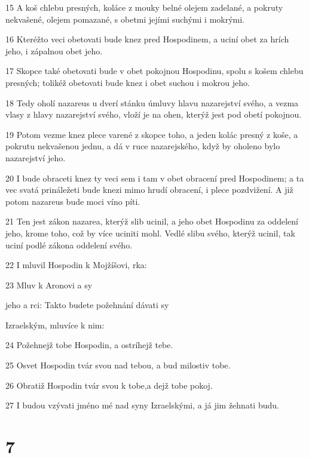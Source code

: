 \par 15 A koš chlebu presných, koláce z mouky belné olejem zadelané, a pokruty nekvašené, olejem pomazané, s obetmi jejími suchými i mokrými.
\par 16 Kteréžto veci obetovati bude knez pred Hospodinem, a uciní obet za hrích jeho, i zápalnou obet jeho.
\par 17 Skopce také obetovati bude v obet pokojnou Hospodinu, spolu s košem chlebu presných; tolikéž obetovati bude knez i obet suchou i mokrou jeho.
\par 18 Tedy oholí nazareus u dverí stánku úmluvy hlavu nazarejství svého, a vezma vlasy z hlavy nazarejství svého, vloží je na ohen, kterýž jest pod obetí pokojnou.
\par 19 Potom vezme knez plece varené z skopce toho, a jeden kolác presný z koše, a pokrutu nekvašenou jednu, a dá v ruce nazarejského, když by oholeno bylo nazarejství jeho.
\par 20 I bude obraceti knez ty veci sem i tam v obet obracení pred Hospodinem; a ta vec svatá prináležeti bude knezi mimo hrudí obracení, i plece pozdvižení. A již potom nazareus bude moci víno píti.
\par 21 Ten jest zákon nazarea, kterýž slib ucinil, a jeho obet Hospodinu za oddelení jeho, krome toho, což by více uciniti mohl. Vedlé slibu svého, kterýž ucinil, tak uciní podlé zákona oddelení svého.
\par 22 I mluvil Hospodin k Mojžíšovi, rka:
\par 23 Mluv k Aronovi a sy\par jeho a rci: Takto budete požehnání dávati sy\par Izraelským, mluvíce k nim:
\par 24 Požehnejž tobe Hospodin, a ostríhejž tebe.
\par 25 Osvet Hospodin tvár svou nad tebou, a bud milostiv tobe.
\par 26 Obratiž Hospodin tvár svou k tobe,a dejž tobe pokoj.
\par 27 I budou vzývati jméno mé nad syny Izraelskými, a já jim žehnati budu.

\chapter{7}

